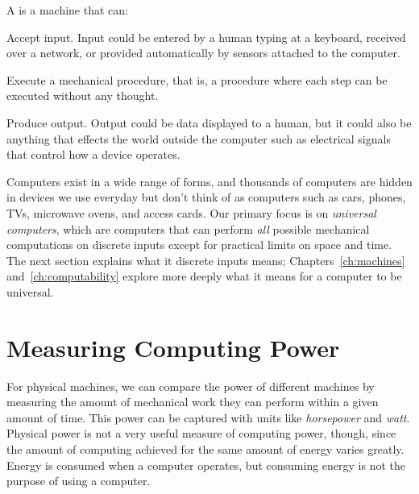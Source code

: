 A  is a machine that can:
\begin{enumtight}
\item Accept input.  Input could be entered by a human typing at a keyboard, received over a network, or provided automatically by sensors attached to the computer.
\item Execute a mechanical procedure, that is, a procedure where each step can be executed without any thought.
\item Produce output.  Output could be data displayed to a human, but it could also be anything that effects the world outside the computer such as electrical signals that control how a device operates.
\end{enumtight}

Computers exist in a wide range of forms, and thousands of computers are hidden in devices we use everyday but don't think of as computers such as cars, phones, TVs, microwave ovens, and access cards.    Our primary focus is on \emph{universal computers}, which are computers that can perform {\em all} possible mechanical computations on discrete inputs except for practical limits on space and time.  The next section explains what it discrete inputs means; Chapters~\ref{ch:machines} and~\ref{ch:computability} explore more deeply what it means for a computer to be universal.

\section{Measuring Computing Power}\label{sec:computing-power}

For physical machines, we can compare the power of different machines by measuring the amount of mechanical work they can perform within a given amount of time.  This power can be captured with units like {\em horsepower} and {\em watt}.  Physical power is not a very useful measure of computing power, though, since the amount of computing achieved for the same amount of energy varies greatly.  Energy is consumed when a computer operates, but consuming energy is not the purpose of using a computer.

